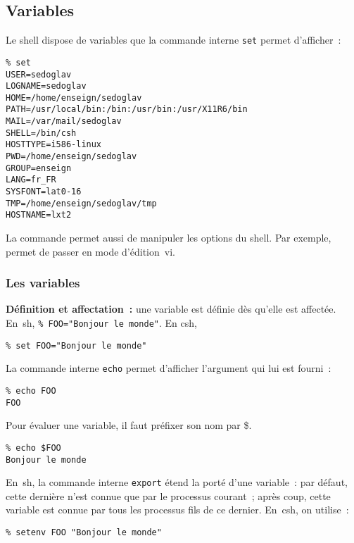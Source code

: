 \subsection{Variables}
\begin{frame}[fragile]
  Le shell dispose de variables que la commande interne \texttt{set}
  permet d'afficher~:
\begin{verbatim}
% set
USER=sedoglav
LOGNAME=sedoglav
HOME=/home/enseign/sedoglav
PATH=/usr/local/bin:/bin:/usr/bin:/usr/X11R6/bin
MAIL=/var/mail/sedoglav
SHELL=/bin/csh
HOSTTYPE=i586-linux
PWD=/home/enseign/sedoglav
GROUP=enseign
LANG=fr_FR
SYSFONT=lat0-16
TMP=/home/enseign/sedoglav/tmp
HOSTNAME=lxt2
\end{verbatim}
  La commande  permet aussi de manipuler les options du
  shell. Par exemple,  permet de passer en mode
  d'\'edition~vi.
\end{frame}
\begin{frame}[fragile]
  \frametitle{Les variables}%
  \textbf{D\'efinition et affectation~:} une variable est d\'efinie
  d\`es qu'elle est affect\'ee. En~sh, %
  \verb+% FOO="Bonjour le monde"+. En csh,
\begin{verbatim}
% set FOO="Bonjour le monde"
\end{verbatim}
  La commande interne \texttt{echo} permet d'afficher l'argument qui
  lui est fourni~:
\begin{verbatim}
% echo FOO
FOO
\end{verbatim}
  Pour \'evaluer une variable, il faut pr\'efixer son nom par \$.
\begin{verbatim}
% echo $FOO
Bonjour le monde
\end{verbatim}
  En~sh, la commande interne \texttt{export} \'etend la port\'e d'une
  variable~: par d\'efaut, cette derni\`ere n'est connue que par le
  processus courant~; apr\`es coup, cette variable est connue par tous
  les processus fils de ce dernier. En~csh, on utilise~:
\begin{verbatim}
% setenv FOO "Bonjour le monde"
\end{verbatim}
\end{frame}
